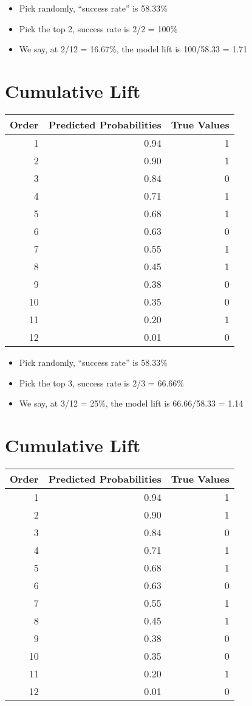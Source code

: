 \documentclass[
]{article}
\providecommand{\tightlist}{%
  \setlength{\itemsep}{0pt}\setlength{\parskip}{0pt}}
\begin{document}
\begin{itemize}
\tightlist
\item
  Pick randomly, ``success rate'' is 58.33\%
\item
  Pick the top 2, success rate is 2/2 = 100\%
\item
  We say, at 2/12 = 16.67\%, the model lift is 100/58.33 = 1.71
\end{itemize}

\hypertarget{cumulative-lift-5}{%
\section{Cumulative Lift}\label{cumulative-lift-5}}

\begin{longtable}[]{@{}rrr@{}}
\toprule
Order & Predicted Probabilities & True Values\tabularnewline
\midrule
\endhead
1 & 0.94 & 1\tabularnewline
2 & 0.90 & 1\tabularnewline
3 & 0.84 & 0\tabularnewline
4 & 0.71 & 1\tabularnewline
5 & 0.68 & 1\tabularnewline
6 & 0.63 & 0\tabularnewline
7 & 0.55 & 1\tabularnewline
8 & 0.45 & 1\tabularnewline
9 & 0.38 & 0\tabularnewline
10 & 0.35 & 0\tabularnewline
11 & 0.20 & 1\tabularnewline
12 & 0.01 & 0\tabularnewline
\bottomrule
\end{longtable}

\begin{itemize}
\tightlist
\item
  Pick randomly, ``success rate'' is 58.33\%
\item
  Pick the top 3, success rate is 2/3 = 66.66\%
\item
  We say, at 3/12 = 25\%, the model lift is 66.66/58.33 = 1.14
\end{itemize}

\hypertarget{cumulative-lift-6}{%
\section{Cumulative Lift}\label{cumulative-lift-6}}

\begin{longtable}[]{@{}rrr@{}}
\toprule
Order & Predicted Probabilities & True Values\tabularnewline
\midrule
\endhead
1 & 0.94 & 1\tabularnewline
2 & 0.90 & 1\tabularnewline
3 & 0.84 & 0\tabularnewline
4 & 0.71 & 1\tabularnewline
5 & 0.68 & 1\tabularnewline
6 & 0.63 & 0\tabularnewline
7 & 0.55 & 1\tabularnewline
8 & 0.45 & 1\tabularnewline
9 & 0.38 & 0\tabularnewline
10 & 0.35 & 0\tabularnewline
11 & 0.20 & 1\tabularnewline
12 & 0.01 & 0\tabularnewline
\bottomrule
\end{longtable}
\end{document}
